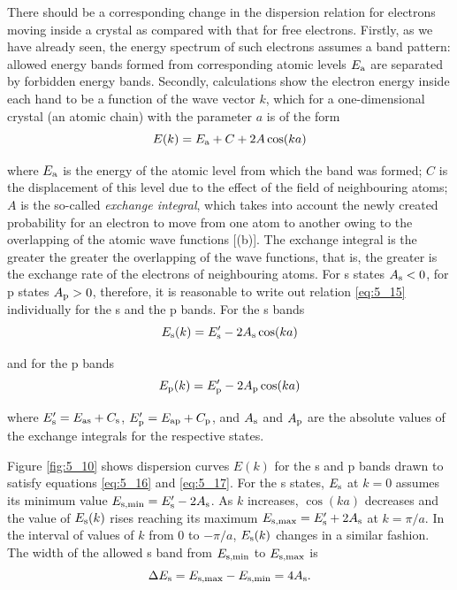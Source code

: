There should be a corresponding change in the dispersion relation for electrons moving inside a crystal as compared with that for free electrons. Firstly, as we have already seen, the energy spectrum of such electrons assumes a band pattern: allowed energy bands formed from corresponding atomic levels $E_{\text{a}}$ are separated by forbidden energy bands. Secondly, calculations show the electron energy inside each hand to be a function of the wave vector $k$, which for a one-dimensional crystal (an atomic chain) with the parameter $a$ is of the form
\begin{equation}\label{eq:5_15}
    E(k) = E_{\text{a}} + C + 2 A \cos(ka)
\end{equation}

\noindent
where $E_{\text{a}}$ is the energy of the atomic level from which the band was formed; $C$ is the displacement of this level due to the effect of the field of neighbouring atoms; $A$ is the so-called \textit{exchange integral}, which takes into account the newly created probability for an electron to move from one atom to another owing to the overlapping of the atomic wave functions [(b)]. The exchange integral is the greater the greater the overlapping of the wave functions, that is, the greater is the exchange rate of the electrons of neighbouring atoms. For s states $A_{\text{s}}<0$, for p states $A_{\text{p}}>0$, therefore, it is reasonable to write out relation \eqref{eq:5_15} individually for the s and the p bands. For the s bands
\begin{equation}\label{eq:5_16}
    E_{\text{s}}(k) = E_{\text{s}}' - 2 A_{\text{s}} \cos(ka)
\end{equation}

\noindent
and for the p bands
\begin{equation}\label{eq:5_17}
    E_{\text{p}}(k) = E_{\text{p}}' - 2 A_{\text{p}} \cos(ka)
\end{equation}

\noindent
where $E_{\text{s}}'=E_{\text{as}}+C_{\text{s}}$, $E_{\text{p}}'=E_{\text{ap}}+C_{\text{p}}$, and $A_{\text{s}}$ and $A_{\text{p}}$ are the absolute values of the exchange integrals for the respective states.

Figure \ref{fig:5_10} shows dispersion curves $E(k)$ for the s and p bands drawn to satisfy equations \eqref{eq:5_16} and \eqref{eq:5_17}. For the s states, $E_{\text{s}}$ at $k=0$ assumes its minimum value $E_{\text{s,min}}=E_{\text{s}}'-2A_{\text{s}}$.
As $k$ increases, $\cos(ka)$ decreases and the value of $E_{\text{s}}(k)$ rises reaching its maximum $E_{\text{s,max}}=E_{\text{s}}'+2A_{\text{s}}$ at $k=\pi/a$. In the interval of values of $k$ from $0$ to $-\pi/a$, $E_{\text{s}}(k)$ changes in a similar fashion.
The width of the allowed s band from $E_{\text{s,min}}$ to $E_{\text{s,max}}$ is
\begin{equation}\label{eq:5_18}
    \Delta{E_{\text{s}}} = E_{\text{s,max}} - E_{\text{s,min}} = 4 A_{\text{s}}.
\end{equation}

